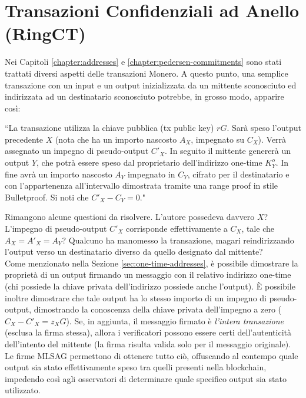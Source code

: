 \chapter{Transazioni Confidenziali ad Anello (RingCT)}
\label{chapter:transactions}

Nei Capitoli \ref{chapter:addresses} e \ref{chapter:pedersen-commitments} sono stati trattati diversi aspetti delle transazioni Monero. A questo punto, una semplice transazione con un input e un output inizializzata da un mittente sconosciuto ed indirizzata ad un destinatario sconosciuto potrebbe, in grosso modo, apparire così:

``La transazione utilizza la chiave pubblica (tx public key) $r G$. Sarà speso l’output precedente $X$ (nota che ha un importo nascosto $A_X$, impegnato su $C_X$). Verrà assegnato un impegno di pseudo-output $C'_X$. In seguito il mittente genererà un output $Y$, che potrà essere speso dal proprietario dell'indirizzo one-time $K^o_Y$. In fine avrà un importo nascosto $A_Y$ impegnato in $C_Y$, cifrato per il destinatario e con l'appartenenza all'intervallo dimostrata tramite una range proof in stile Bulletproof. Si noti che $C'_X - C_Y = 0$."

Rimangono alcune questioni da risolvere. L’autore possedeva davvero $X$? L’impegno di pseudo-output $C'_X$ corrisponde effettivamente a $C_X$, tale che $A_X = A'_X = A_Y$? Qualcuno ha manomesso la transazione, magari reindirizzando l’output verso un destinatario diverso da quello designato dal mittente?
\\

Come menzionato nella Sezione \ref{sec:one-time-addresses}, è possibile dimostrare la proprietà di un output firmando un messaggio con il relativo indirizzo one-time (chi possiede la chiave privata dell’indirizzo possiede anche l’output). È possibile inoltre dimostrare che tale output ha lo stesso importo di un impegno di pseudo-output, dimostrando la conoscenza della chiave privata dell’impegno a zero ($C_X - C'_X = z_X G$). Se, in aggiunta, il messaggio firmato è {\em l'intera transazione} (esclusa la firma stessa), allora i verificatori possono essere certi dell’autenticità dell’intento del mittente (la firma risulta valida solo per il messaggio originale). Le firme MLSAG permettono di ottenere tutto ciò, offuscando al contempo quale output sia stato effettivamente speso tra quelli presenti nella blockchain, impedendo così agli osservatori di determinare quale specifico output sia stato utilizzato.



